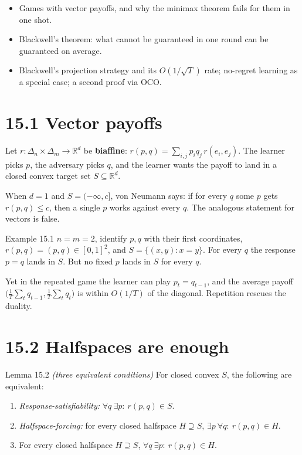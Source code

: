 \documentclass[11pt,a4paper,openany]{book}
\newcommand{\R}{\mathbb{R}}
\newcommand{\simplex}{\Delta}
\begin{document}
\begin{goals}
\begin{itemize}
\item Games with vector payoffs, and why the minimax theorem fails for them in one shot.
\item Blackwell's theorem: what cannot be guaranteed in one round can be guaranteed on average.
\item Blackwell's projection strategy and its $O(1/\sqrt T)$ rate; no-regret learning as a special case; a second proof via OCO.
\end{itemize}
\end{goals}

\section*{15.1 Vector payoffs}\label{ch15-vector}

Let $r:\simplex_n\times\simplex_m\to\R^d$ be \textbf{biaffine}: $r(p,q)=\sum_{i,j}p_iq_j\,r(e_i,e_j)$. The learner picks $p$, the adversary picks $q$, and the learner wants the payoff to land in a closed convex target set $S\subseteq\R^d$.

When $d=1$ and $S=(-\infty,c]$, von Neumann says: if for every $q$ some $p$ gets $r(p,q)\le c$, then a single $p$ works against every $q$. The analogous statement for vectors is false.

\begin{bexample}{Example 15.1}
$n=m=2$, identify $p,q$ with their first coordinates, $r(p,q)=(p,q)\in[0,1]^2$, and $S=\{(x,y):x=y\}$. For every $q$ the response $p=q$ lands in $S$. But no fixed $p$ lands in $S$ for every $q$.

Yet in the repeated game the learner can play $p_t=q_{t-1}$, and the average payoff $\big(\frac1T\sum_tq_{t-1},\frac1T\sum_tq_t\big)$ is within $O(1/T)$ of the diagonal. Repetition rescues the duality.
\end{bexample}

\section*{15.2 Halfspaces are enough}\label{ch15-halfspace}

\begin{bthm}{Lemma 15.2 \emph{(three equivalent conditions)}}
For closed convex $S$, the following are equivalent:

\begin{enumerate}
\item \emph{Response-satisfiability:} $\forall q\ \exists p:\ r(p,q)\in S$.
\item \emph{Halfspace-forcing:} for every closed halfspace $H\supseteq S$, $\exists p\ \forall q:\ r(p,q)\in H$.
\item For every closed halfspace $H\supseteq S$, $\forall q\ \exists p:\ r(p,q)\in H$.
\end{enumerate}
\end{bthm}
\end{document}
